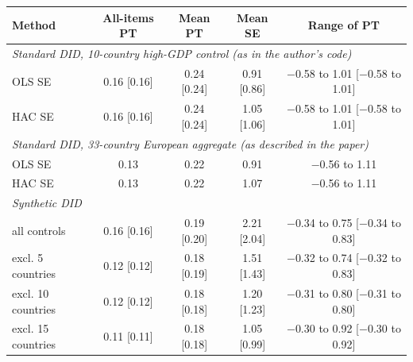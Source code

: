 \begin{tabular}{lcccc}
\toprule
Method & All-items PT & Mean PT & Mean SE & Range of PT \\
\midrule
\multicolumn{5}{l}{\textit{Standard DID, 10-country high-GDP control (as in the author's code)}} \\
\quad OLS SE & 0.16 [0.16] & 0.24 [0.24] & 0.91 [0.86] & $-$0.58 to 1.01 [$-$0.58 to 1.01] \\
\quad HAC SE & 0.16 [0.16] & 0.24 [0.24] & 1.05 [1.06] & $-$0.58 to 1.01 [$-$0.58 to 1.01] \\
\multicolumn{5}{l}{\textit{Standard DID, 33-country European aggregate (as described in the paper)}} \\
\quad OLS SE & 0.13 & 0.22 & 0.91 & $-$0.56 to 1.11 \\
\quad HAC SE & 0.13 & 0.22 & 1.07 & $-$0.56 to 1.11 \\
\multicolumn{5}{l}{\textit{Synthetic DID}} \\
\quad all controls & 0.16 [0.16] & 0.19 [0.20] & 2.21 [2.04] & $-$0.34 to 0.75 [$-$0.34 to 0.83] \\
\quad excl. 5 countries & 0.12 [0.12] & 0.18 [0.19] & 1.51 [1.43] & $-$0.32 to 0.74 [$-$0.32 to 0.83] \\
\quad excl. 10 countries & 0.12 [0.12] & 0.18 [0.18] & 1.20 [1.23] & $-$0.31 to 0.80 [$-$0.31 to 0.80] \\
\quad excl. 15 countries & 0.11 [0.11] & 0.18 [0.18] & 1.05 [0.99] & $-$0.30 to 0.92 [$-$0.30 to 0.92] \\
\bottomrule
\end{tabular}
